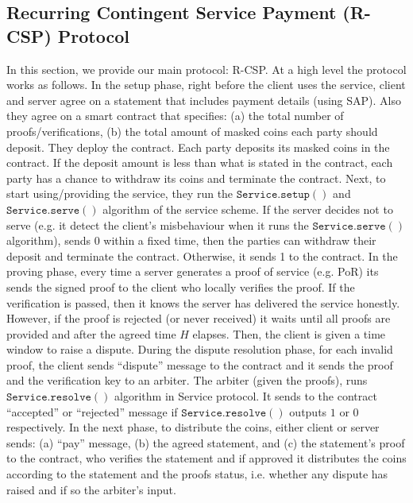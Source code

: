

\subsection{Recurring Contingent Service Payment (R-CSP) Protocol}


In this section, we provide our main protocol: R-CSP. At a high level the protocol works as follows.  In the setup phase, right before the client uses the service,  client and server agree on a statement that includes payment details (using SAP). Also they agree on  a smart contract that specifies: (a) the total number of proofs/verifications, (b) the total amount of masked coins each party should deposit. They deploy the contract.  Each party deposits its masked coins in the contract. If the deposit amount is less than what is stated in the contract, each party has a chance to withdraw its coins and terminate the contract. Next, to start using/providing the service, they run the $\mathtt{Service.setup}()$ and $\mathtt{Service.serve}()$ algorithm of the  service scheme. If the server decides not to serve (e.g. it detect the client's misbehaviour when it runs the $\mathtt{Service.serve()}$ algorithm),  sends 0  within a fixed time, then the parties can withdraw their deposit and terminate the contract. Otherwise, it sends 1 to the contract. In the proving phase, every time a server generates a proof of service (e.g. PoR) its sends the signed proof to the client who locally verifies the proof. If the verification is passed, then it knows the server has delivered the service honestly. However, if the proof is rejected (or never received) it waits until all proofs are provided and after the agreed time $H$  elapses.  Then, the client is given a time window to raise a dispute.  During the dispute resolution phase, for each invalid proof, the client sends ``dispute'' message to the contract and it sends the proof and the verification key to an arbiter. The arbiter (given the proofs), runs $\mathtt{Service.resolve()}$ algorithm in Service protocol. It sends to the contract ``accepted'' or ``rejected'' message if $\mathtt{Service.resolve}()$ outputs $1$ or $0$ respectively. In the next phase, to distribute the coins, either client or server  sends: (a) ``pay'' message, (b) the agreed statement, and (c) the statement's proof to the contract, who verifies the statement and if approved it distributes the coins according to the statement and the proofs status, i.e. whether any dispute has raised and if so the arbiter's input. 

